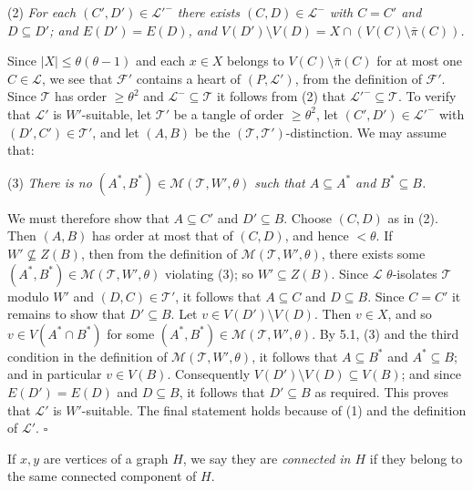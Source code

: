 \hspace*{12pt}(2) \textit{For each $(C', D') \in \mathcal{L}'^-$ there exists $(C, D) \in \mathcal{L}^-$ with $C = C'$ and $D \subseteq D'$; and $E(D') = E(D)$, and $V(D') \setminus V(D) = X \cap (V(C) \setminus \bar{\pi}(C))$.}

Since $|X| \le \theta(\theta - 1)$ and each $x \in X$ belongs to $V(C) \setminus \bar{\pi}(C)$ for at most one $C \in \mathcal{L}$, we see that $\mathcal{F}'$ contains a heart of $(P, \mathcal{L}')$, from the definition of $\mathcal{F}'$. Since $\mathcal{T}$ has order $\ge \theta^2$ and $\mathcal{L}^- \subseteq \mathcal{T}$ it follows from (2) that $\mathcal{L}'^- \subseteq \mathcal{T}$. To verify that $\mathcal{L}'$ is $W'$-suitable, let $\mathcal{T}'$ be a tangle of order $\ge \theta^2$, let $(C', D') \in \mathcal{L}'^-$ with $(D', C') \in \mathcal{T}'$, and let $(A, B)$ be the $(\mathcal{T}, \mathcal{T}')$-distinction. We may assume that:

\hspace*{12pt}(3) \textit{There is no $(A^*, B^*) \in \mathcal{M}(\mathcal{T}, W', \theta)$ such that $A \subseteq A^*$ and $B^* \subseteq B$.}

We must therefore show that $A \subseteq C'$ and $D' \subseteq B$. Choose $(C, D)$ as in (2). Then $(A, B)$ has order at most that of $(C, D)$, and hence $< \theta$. If $W' \nsubseteq Z(B)$, then from the definition of $\mathcal{M}(\mathcal{T}, W', \theta)$, there exists some $(A^*, B^*) \in \mathcal{M}(\mathcal{T}, W', \theta)$ violating (3); so $W' \subseteq Z(B)$. Since $\mathcal{L}$ $\theta$-isolates $\mathcal{T}$ modulo $W'$ and $(D, C) \in \mathcal{T}'$, it follows that $A \subseteq C$ and $D \subseteq B$. Since $C = C'$ it remains to show that $D' \subseteq B$. Let $v \in V(D') \setminus V(D)$. Then $v \in X$, and so $v \in V(A^* \cap B^*)$ for some $(A^*, B^*) \in \mathcal{M}(\mathcal{T}, W', \theta)$. By 5.1, (3) and the third condition in the definition of $\mathcal{M}(\mathcal{T}, W', \theta)$, it follows that $A \subseteq B^*$ and $A^* \subseteq B$; and in particular $v \in V(B)$. Consequently $V(D') \setminus V(D) \subseteq V(B)$; and since $E(D') = E(D)$ and $D \subseteq B$, it follows that $D' \subseteq B$ as required. This proves that $\mathcal{L}'$ is $W'$-suitable. The final statement holds because of (1) and the definition of $\mathcal{L}'$. $\square$

If $x, y$ are vertices of a graph $H$, we say they are \textit{connected in $H$} if they belong to the same connected component of $H$.

